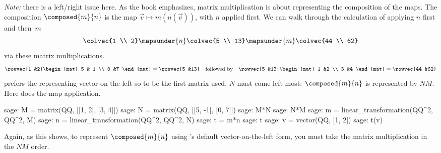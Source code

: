 \textit{Note:} there is a left/right issue here.
As the book emphasizes, matrix multiplication is about 
representing the composition of the maps.
The composition $\composed{m}{n}$ is the map $\vec{v}\mapsto m(n(\vec{v}))$, 
with $n$ applied first. 
We can walk through the calculation of applying $n$ first and then~$m$
\begin{equation*}
  \colvec{1 \\ 2}
   \mapsunder{n}
  \colvec{5 \\ 13}
   \mapsunder{m}
  \colvec{44 \\ 62}
\end{equation*}
via these matrix multiplications.
\begin{equation*}
  \rowvec{1 &2}
  \begin{mat}
    5 &-1 \\ 
    0 &7
  \end{mat}
  =\rowvec{5 &13}
  \quad\text{followed by}\quad
  \rowvec{5 &13}
  \begin{mat}
    1 &2 \\ 
    3 &4
  \end{mat}
  =\rowvec{44 &62}
\end{equation*}
\Sage{} prefers the representing vector on the left so to be the 
first matrix used, $N$ must come left-most: $\composed{m}{n}$ is represented 
by $NM$.
Here \Sage{} does the map application.
\begin{sagecommandline}
sage: M = matrix(QQ, [[1, 2], [3, 4]])
sage: N = matrix(QQ, [[5, -1], [0, 7]])
sage: M*N
sage: N*M
sage: m = linear_transformation(QQ^2, QQ^2, M)
sage: n = linear_transformation(QQ^2, QQ^2, N)
sage: t = m*n
sage: t
sage: v = vector(QQ, [1, 2])
sage: t(v)
\end{sagecommandline}
Again, as this shows,
to represent $\composed{m}{n}$ using
\Sage's default vector-on-the-left form, 
you must take the matrix multiplication in the $NM$ order. 








\endinput


TODO:
